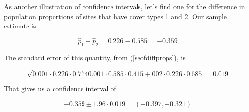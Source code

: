 As another illustration of confidence intervals, let's find one for the
difference in population proportions of sites that have cover types 1
and 2.  Our sample estimate is 

\begin{equation}
\widehat{p}_1 - \widehat{p}_2 = 0.226 - 0.585 = -0.359
\end{equation}

The standard error of this quantity, from (\ref{seofdiffprops}), is

\begin{equation}
\sqrt{
0.001 \cdot 0.226 \cdot 0.774
0.001 \cdot 0.585 \cdot 0.415
+002 \cdot 0.226 \cdot 0.585
} 
= 0.019
\end{equation}

That gives us a confidence interval of 

\begin{equation}
-0.359 \pm 1.96 \cdot 0.019 = (-0.397,-0.321)
\end{equation}

